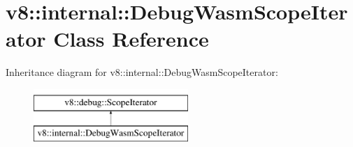 \hypertarget{classv8_1_1internal_1_1DebugWasmScopeIterator}{}\section{v8\+:\+:internal\+:\+:Debug\+Wasm\+Scope\+Iterator Class Reference}
\label{classv8_1_1internal_1_1DebugWasmScopeIterator}
Inheritance diagram for v8\+:\+:internal\+:\+:Debug\+Wasm\+Scope\+Iterator\+:\begin{figure}[H]
\begin{center}
\leavevmode
\includegraphics[height=2.000000cm]{classv8_1_1internal_1_1DebugWasmScopeIterator}
\end{center}
\end{figure}
